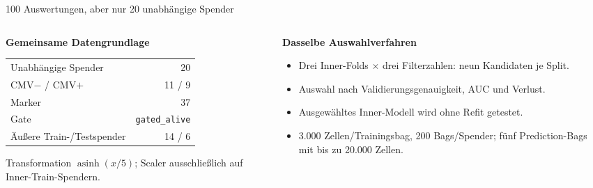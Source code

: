 \documentclass[aspectratio=169,10pt]{beamer}
\newcommand{\eyebrow}[1]{{\color{Teal}\bfseries #1}\par\smallskip}
\begin{document}
\begin{frame}{100 Auswertungen, aber nur 20 unabhängige Spender}
  \begin{columns}[T,onlytextwidth]
    \begin{column}{.47\textwidth}
      \eyebrow{Gemeinsame Datengrundlage}
      \begin{tabular}{@{}lr@{}}\toprule
      Unabhängige Spender & 20\\
      CMV$-$ / CMV$+$ & 11 / 9\\
      Marker & 37\\
      Gate & \texttt{gated\_alive}\\
      Äußere Train-/Testspender & 14 / 6\\\bottomrule
      \end{tabular}
      \medskip\par
      \small Transformation $\operatorname{asinh}(x/5)$; Scaler ausschließlich auf Inner-Train-Spendern.
    \end{column}
    \begin{column}{.49\textwidth}
      \eyebrow{Dasselbe Auswahlverfahren}
      \begin{itemize}
        \item Drei Inner-Folds $\times$ drei Filterzahlen: neun Kandidaten je Split.
        \item Auswahl nach Validierungsgenauigkeit, AUC und Verlust.
        \item Ausgewähltes Inner-Modell wird ohne Refit getestet.
        \item 3.000 Zellen/Trainingsbag, 200 Bags/Spender; fünf Prediction-Bags mit bis zu 20.000 Zellen.
      \end{itemize}
    \end{column}
  \end{columns}
\end{frame}
\end{document}
